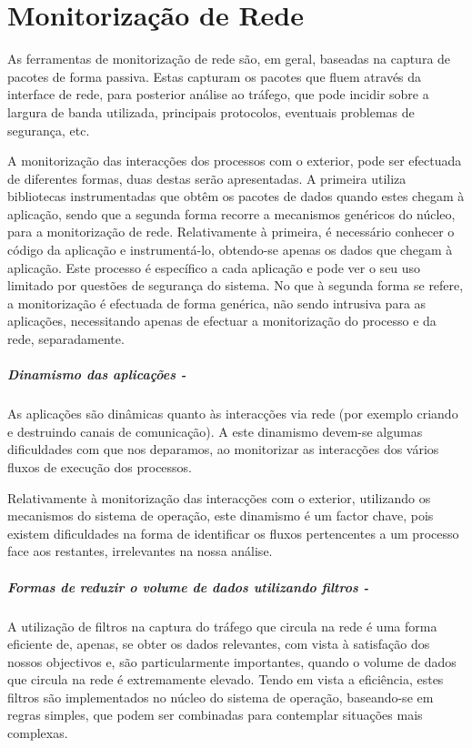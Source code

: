 \section{Monitorização de Rede}\label{sub:network_monitoring}

As ferramentas de monitorização de rede são, em geral, baseadas na captura de pacotes de forma passiva.
Estas capturam os pacotes que fluem através da interface de rede, para posterior análise ao tráfego, que pode incidir sobre a largura de banda utilizada, principais protocolos, eventuais problemas de segurança, etc.

A monitorização das interacções dos processos com o exterior, pode ser efectuada de diferentes formas, duas destas serão apresentadas.
A primeira utiliza bibliotecas instrumentadas que obtêm os pacotes de dados quando estes chegam à aplicação, sendo que a segunda forma recorre a mecanismos genéricos do núcleo, para a monitorização de rede.
Relativamente à primeira, é necessário conhecer o código da aplicação e instrumentá-lo, obtendo-se apenas os dados que chegam à aplicação.
Este processo é específico a cada aplicação e pode ver o seu uso limitado por questões de segurança do sistema.
No que à segunda forma se refere, a monitorização é efectuada de forma genérica, não sendo intrusiva para as aplicações, necessitando apenas de efectuar a monitorização do processo e da rede, separadamente. 

\subparagraph*{Dinamismo das aplicações - }
As aplicações são dinâmicas quanto às interacções via rede (por exemplo criando e destruindo canais de comunicação).
A este dinamismo devem-se algumas dificuldades com que nos deparamos, ao monitorizar as interacções dos vários fluxos de execução dos processos.

Relativamente à monitorização das interacções com o exterior, utilizando os mecanismos do sistema de operação, este dinamismo é um factor chave, pois existem dificuldades na forma de identificar os fluxos pertencentes a um processo face aos restantes, irrelevantes na nossa análise.

\subparagraph*{Formas de reduzir o volume de dados utilizando filtros - }
A utilização de filtros na captura do tráfego que circula na rede é uma forma eficiente de, apenas, se obter os dados relevantes, com vista à satisfação dos nossos objectivos e, são particularmente importantes, quando o volume de dados que circula na rede é extremamente elevado.
Tendo em vista a eficiência, estes filtros são implementados no núcleo do sistema de operação, baseando-se em regras simples, que podem ser combinadas para contemplar situações mais complexas.

